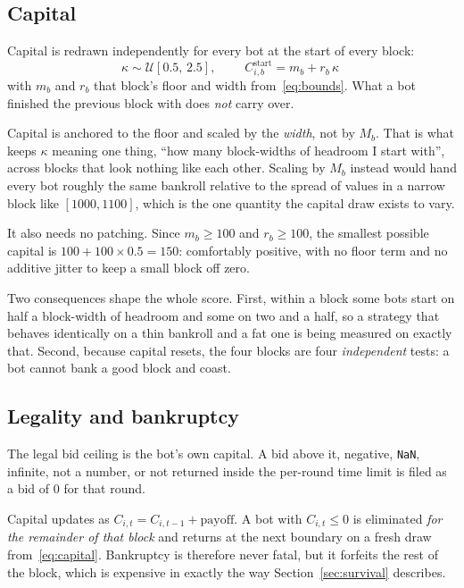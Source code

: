 \documentclass[11pt,a4paper]{article}
\newcommand{\code}[1]{\texttt{\small #1}}
\begin{document}
\subsection{Capital}
\label{sec:capital}
Capital is redrawn independently for every bot at the start of every block:
\begin{equation}
  \kappa \sim \mathcal{U}[0.5,\, 2.5],
  \qquad
  \boxed{\;C^{\text{start}}_{i,b} = m_b + r_b\,\kappa\;}
  \label{eq:capital}
\end{equation}
with $m_b$ and $r_b$ that block's floor and width from~\eqref{eq:bounds}. What a
bot finished the previous block with does \emph{not} carry over.

Capital is anchored to the floor and scaled by the \emph{width}, not by $M_b$.
That is what keeps $\kappa$ meaning one thing, ``how many block-widths of
headroom I start with'', across blocks that look nothing like each other.
Scaling by $M_b$ instead would hand every bot roughly the same bankroll relative
to the spread of values in a narrow block like $[1000, 1100]$, which is the one
quantity the capital draw exists to vary.

It also needs no patching. Since $m_b \ge 100$ and $r_b \ge 100$, the smallest
possible capital is $100 + 100 \times 0.5 = 150$: comfortably positive, with no
floor term and no additive jitter to keep a small block off zero.

Two consequences shape the whole score. First, within a block some bots start on
half a block-width of headroom and some on two and a half, so a strategy that
behaves identically on a thin bankroll and a fat one is being measured on
exactly that. Second, because capital resets, the four blocks are four
\emph{independent} tests: a bot cannot bank a good block and coast.

\subsection{Legality and bankruptcy}
The legal bid ceiling is the bot's own capital. A bid above it, negative,
\code{NaN}, infinite, not a number, or not returned inside the per-round time
limit is filed as a bid of $0$ for that round.

Capital updates as $C_{i,t} = C_{i,t-1} + \text{payoff}$. A bot with
$C_{i,t} \le 0$ is eliminated \emph{for the remainder of that block} and returns
at the next boundary on a fresh draw from~\eqref{eq:capital}. Bankruptcy is
therefore never fatal, but it forfeits the rest of the block, which is expensive
in exactly the way Section~\ref{sec:survival} describes.
\end{document}

